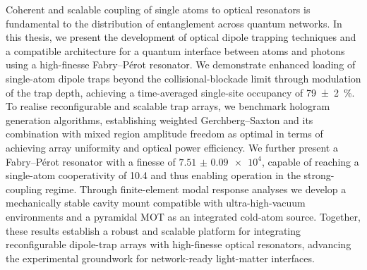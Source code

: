 \documentclass[../Thesis-IJspeert.tex]{subfiles}
\begin{document}
Coherent and scalable coupling of single atoms to optical resonators is fundamental to the distribution of entanglement across quantum networks. In this thesis, we present the development of optical dipole trapping techniques and a compatible architecture for a quantum interface between atoms and photons using a high-finesse Fabry--Pérot resonator. We demonstrate enhanced loading of single-atom dipole traps beyond the collisional-blockade limit through modulation of the trap depth, achieving a time-averaged single-site occupancy of \SI{79\pm 2}{\percent}. To realise reconfigurable and scalable trap arrays, we benchmark hologram generation algorithms, establishing weighted Gerchberg--Saxton and its combination with mixed region amplitude freedom as optimal in terms of achieving array uniformity and optical power efficiency. We further present a Fabry--Pérot resonator with a finesse of $\num{7.51(9)e4}$, capable of reaching a single-atom cooperativity of \num{10.4} and thus enabling operation in the strong-coupling regime. Through finite-element modal response analyses we develop a mechanically stable cavity mount compatible with ultra-high-vacuum environments and a pyramidal MOT as an integrated cold-atom source. Together, these results establish a robust and scalable platform for integrating reconfigurable dipole-trap arrays with high-finesse optical resonators, advancing the experimental groundwork for network-ready light-matter interfaces.
\vfill
\begin{center}
\tikzset{external/export next=false}
\end{center}
\pagebreak
\end{document}
